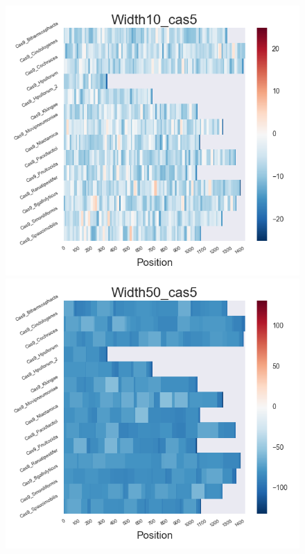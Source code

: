 \documentclass[11pt, oneside]{article}
\begin{document}
\begin{figure}[htbp]
  \centering
  \begin{minipage}{0.32\textwidth}
    \centering
    \includegraphics[width=1\textwidth]{images/Width10_cas5_heatmap} %
  \end{minipage}
  \hfill
  \begin{minipage}{0.32\textwidth}
    \centering
    \includegraphics[width=1\textwidth]{images/Width50_cas5_heatmap} %

\end{minipage}
\end{figure}
\end{document}
